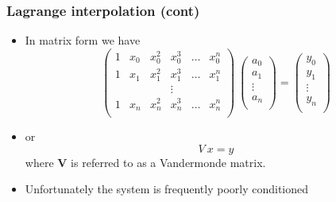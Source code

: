 \documentclass[10pt]{beamer}
\begin{document}
\begin{frame}
  \frametitle{Lagrange interpolation (cont)}
  \begin{itemize}
  \item In matrix form we have
    \[
      \left(
        \begin{array}{cccccc}
          1 & x_0 & x_0^2 & x_0^3 & \ldots & x_0^n \\
          1 & x_1 & x_1^2 & x_1^3 & \ldots & x_1^n \\
            &     &       & \vdots &       &       \\
          1 & x_n & x_n^2 & x_n^3 & \ldots & x_n^n \\
        \end{array}
      \right)
      ~
      \left(
        \begin{array}{c}
          a_0 \\ a_1 \\ \vdots \\ a_n \\
        \end{array}
      \right)
      =
      \left(
        \begin{array}{c}
          y_0 \\ y_1 \\ \vdots \\ y_n \\
        \end{array}
      \right)
    \]
  \item or
    \[ V~x = y \]
    where $\mathbf{V}$ is referred to as a Vandermonde matrix.
  \item Unfortunately the system is frequently poorly conditioned
  \end{itemize}
\end{frame}
\end{document}
